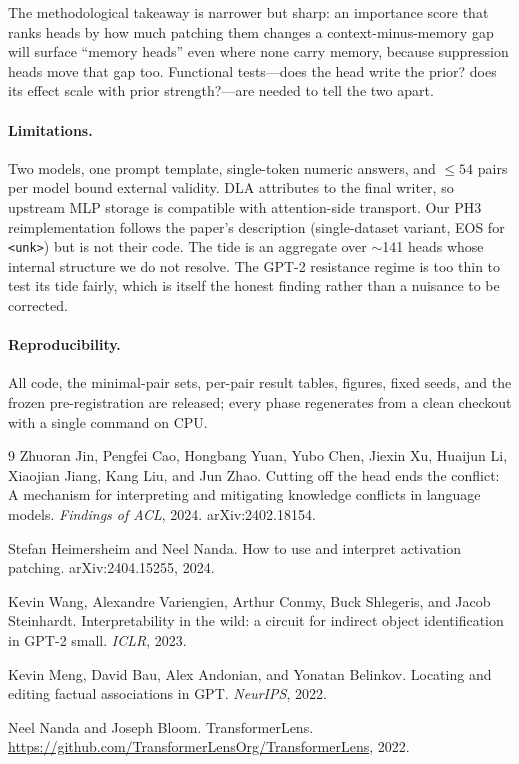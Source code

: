 \documentclass[11pt]{article}
\begin{document}
The methodological takeaway is narrower but sharp: an importance score that
ranks heads by how much patching them changes a context-minus-memory gap will
surface ``memory heads'' even where none carry memory, because suppression
heads move that gap too. Functional tests---does the head write the prior? does
its effect scale with prior strength?---are needed to tell the two apart.

\paragraph{Limitations.} Two models, one prompt template, single-token numeric
answers, and $\le54$ pairs per model bound external validity. DLA attributes to
the final writer, so upstream MLP storage is compatible with attention-side
transport. Our PH3 reimplementation follows the paper's description
(single-dataset variant, EOS for \texttt{<unk>}) but is not their code. The
tide is an aggregate over $\sim$141 heads whose internal structure we do not
resolve. The GPT-2 resistance regime is too thin to test its tide fairly, which
is itself the honest finding rather than a nuisance to be corrected.

\paragraph{Reproducibility.} All code, the minimal-pair sets, per-pair result
tables, figures, fixed seeds, and the frozen pre-registration are released;
every phase regenerates from a clean checkout with a single command on CPU.

\begin{thebibliography}{9}
Zhuoran Jin, Pengfei Cao, Hongbang Yuan, Yubo Chen, Jiexin Xu, Huaijun Li,
Xiaojian Jiang, Kang Liu, and Jun Zhao.
\newblock Cutting off the head ends the conflict: A mechanism for interpreting
and mitigating knowledge conflicts in language models.
\newblock \emph{Findings of ACL}, 2024. arXiv:2402.18154.

Stefan Heimersheim and Neel Nanda.
\newblock How to use and interpret activation patching.
\newblock arXiv:2404.15255, 2024.

Kevin Wang, Alexandre Variengien, Arthur Conmy, Buck Shlegeris, and Jacob
Steinhardt.
\newblock Interpretability in the wild: a circuit for indirect object
identification in GPT-2 small.
\newblock \emph{ICLR}, 2023.

Kevin Meng, David Bau, Alex Andonian, and Yonatan Belinkov.
\newblock Locating and editing factual associations in GPT.
\newblock \emph{NeurIPS}, 2022.

Neel Nanda and Joseph Bloom.
\newblock TransformerLens.
\newblock \url{https://github.com/TransformerLensOrg/TransformerLens}, 2022.
\end{thebibliography}
\end{document}
